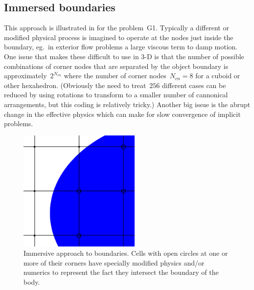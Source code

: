 \subsection{Immersed boundaries}\label{sec:immersed}
This approach is illustrated in  for the problem~G1.
Typically a different or modified physical
process is imagined to operate at the nodes just inside the boundary, eg.\ 
in exterior flow problems a large viscous term to damp motion.
One issue that makes these difficult to use in 3-D is that the number
of possible combinations of corner nodes that are separated by the
object boundary is approximately~$2^{N_{cn}}$ where the number of corner
nodes~$N_{cn}=8$ for a cuboid
or other hexahedron. (Obviously the need to treat~$256$ different cases can be reduced
by using rotations to transform to a smaller number of cannonical arrangements,
but this coding is relatively tricky.)
Another big issue is the abrupt change in the effective physics which
can make for slow convergence of implicit problems.
\begin{figure}
\centerline{\includegraphics[width=6cm]{../pics/fdo} }
\caption{Immersive approach to boundaries. Cells with open circles at one or more
of their corners have specially modified physics and/or numerics to represent
the fact they intersect the boundary of the body.
\label{fig:fdo}}
\end{figure}

\clearpage
